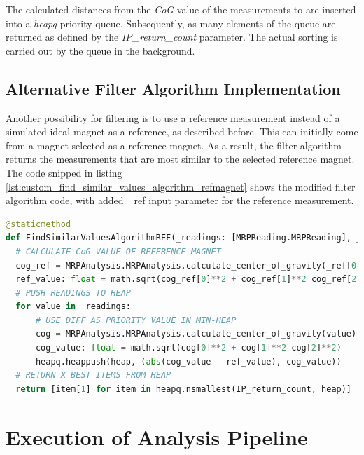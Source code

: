 The calculated distances from the \emph{CoG} value of the measurements
to are inserted into a \emph{heapq} priority queue. Subsequently, as
many elements of the queue are returned as defined by the
\emph{IP\_return\_count} parameter. The actual sorting is carried out by
the queue in the background.

\hypertarget{alternative-filter-algorithm-implementation}{%
\subsection{Alternative Filter Algorithm
Implementation}\label{alternative-filter-algorithm-implementation}}

Another possibility for filtering is to use a reference measurement
instead of a simulated ideal magnet as a reference, as described before.
This can initially come from a magnet selected as a reference magnet. As
a result, the filter algorithm returns the measurements that are most
similar to the selected reference magnet. The code snipped in listing
\ref{lst:custom_find_similar_values_algorithm_refmagnet} shows the
modified filter algorithm code, with added \_ref input parameter for the
reference measurement.

\begin{lstlisting}[language=Python, caption={Modified user implemented custom find algorithm using a reference magnet reading}, label=lst:custom_find_similar_values_algorithm_refmagnet]
@staticmethod
def FindSimilarValuesAlgorithmREF(_readings: [MRPReading.MRPReading], _ref: [MRPReading.MRPReading], IP_return_count: int = 4) -> [MRPReading.MRPReading]:
  # CALCULATE CoG VALUE OF REFERENCE MAGNET
  cog_ref = MRPAnalysis.MRPAnalysis.calculate_center_of_gravity(_ref[0])
  ref_value: float = math.sqrt(cog_ref[0]**2 + cog_ref[1]**2 cog_ref[2]**2)
  # PUSH READINGS TO HEAP
  for value in _readings:
      # USE DIFF AS PRIORITY VALUE IN MIN-HEAP
      cog = MRPAnalysis.MRPAnalysis.calculate_center_of_gravity(value)
      cog_value: float = math.sqrt(cog[0]**2 + cog[1]**2 cog[2]**2)
      heapq.heappush(heap, (abs(cog_value - ref_value), cog_value))
  # RETURN X BEST ITEMS FROM HEAP
  return [item[1] for item in heapq.nsmallest(IP_return_count, heap)]
\end{lstlisting}

\hypertarget{execution-of-analysis-pipeline}{%
\section{Execution of Analysis
Pipeline}\label{execution-of-analysis-pipeline}}

